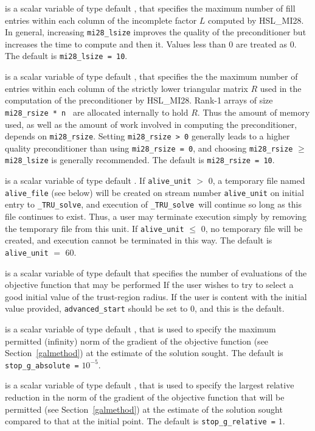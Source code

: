 \documentclass{galahad}
\newcommand{\packagename}{TRU}
\newcommand{\fullpackagename}{\libraryname\_\packagename}
\newcommand{\solver}{{\tt \fullpackagename\_solve}}
\begin{document}
\begin{description}
 is a scalar variable of type default \integer,
that specifies the maximum number of fill entries within each column
of the incomplete factor $L$ computed by HSL\_MI28. In general,
increasing {\tt mi28\_lsize} improves the quality of the preconditioner
but increases the time to compute and then it. Values less than 0 are
treated as 0.
The default is {\tt mi28\_lsize = 10}.

 is a scalar variable of type default \integer,
that specifies the the maximum number of entries within each column of the
strictly lower triangular matrix $R$ used in the computation of the
preconditioner by HSL\_MI28.  Rank-1 arrays of size {\tt mi28\_rsize * n }
are allocated internally to hold $R$. Thus the amount of memory used, as well
as the amount of work involved in computing the preconditioner, depends on
{\tt mi28\_rsize}. Setting {\tt mi28\_rsize > 0} generally leads to a
higher quality preconditioner than using {\tt mi28\_rsize = 0}, and
choosing {\tt mi28\_rsize} $\geq$ {\tt mi28\_lsize} is generally
recommended.
The default is {\tt mi28\_rsize = 10}.


 is a scalar variable of type default \integer.
If {\tt alive\_unit} $>$ 0, a temporary file named {\tt alive\_file} (see below)
will be created on stream number {\tt alive\_unit} on initial entry to
\solver, and execution of \solver\ will continue so
long as this file continues to exist. Thus, a user may terminate execution
simply by removing the temporary file from this unit.
If {\tt alive\_unit} $\leq$ 0, no temporary file will be created, and
execution cannot be terminated in this way.
The default is {\tt alive\_unit} $=$ 60.

 is a scalar variable of type default \integer that
specifies the number of evaluations of the objective function that may
be performed If the user wishes to try to select a good initial value of the
trust-region radius. If the user is content with the initial value provided,
{\tt advanced\_start} should be set to 0, and this is the default.

 is a scalar variable of type default \realdp,
that is used to specify the maximum permitted (infinity)
norm of the gradient of the objective function
(see Section~\ref{galmethod}) at the estimate of the solution sought.
The default is {\tt stop\_g\_absolute =} $10^{-5}$.

 is a scalar variable of type default \realdp,
that is used to specify the largest relative reduction in the norm of the
gradient of the objective function that will be permitted
(see Section~\ref{galmethod}) at the estimate of the solution sought
compared to that at the initial point.
The default is {\tt stop\_g\_relative =} $1$.


\end{description}
\end{document}
